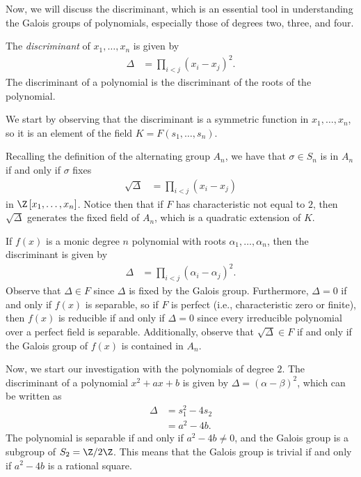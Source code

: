\documentclass[10pt]{mypackage}
\begin{document}
Now, we will discuss the discriminant, which is an essential tool in understanding the Galois groups of polynomials, especially those of degrees two, three, and four.
\begin{definition}
  The \textit{discriminant} of $x_1,\dots,x_n$ is given by
  \begin{align*}
    \Delta &= \prod_{i < j} \left( x_i-x_j \right)^2.
  \end{align*}
  The discriminant of a polynomial is the discriminant of the roots of the polynomial.
\end{definition}
We start by observing that the discriminant is a symmetric function in $x_1,\dots,x_n$, so it is an element of the field $K = F\left( s_1,\dots,s_n \right)$.

Recalling the definition of the alternating group $A_n$, we have that $\sigma\in S_n$ is in $A_n$ if and only if $\sigma$ fixes
\begin{align*}
  \sqrt{\Delta} &= \prod_{i < j} \left( x_i-x_j \right)
\end{align*}
in $\Z\left[ x_1,\dots,x_n \right]$. Notice then that if $F$ has characteristic not equal to $2$, then $\sqrt{\Delta}$ generates the fixed field of $A_n$, which is a quadratic extension of $K$.

If $f(x)$ is a monic degree $n$ polynomial with roots $\alpha_1,\dots,\alpha_n$, then the discriminant is given by
\begin{align*}
  \Delta &= \prod_{i < j} \left( \alpha_i - \alpha_j \right)^2.
\end{align*}
Observe that $\Delta\in F$ since $\Delta$ is fixed by the Galois group. Furthermore, $\Delta = 0$ if and only if $f(x)$ is separable, so if $F$ is perfect (i.e., characteristic zero or finite), then $f(x)$ is reducible if and only if $\Delta = 0$ since every irreducible polynomial over a perfect field is separable. Additionally, observe that $\sqrt{\Delta}\in F$ if and only if the Galois group of $f(x)$ is contained in $A_n$.

Now, we start our investigation with the polynomials of degree $2$. The discriminant of a polynomial $x^2 + ax + b$ is given by $\Delta = \left( \alpha-\beta \right)^2$, which can be written as
\begin{align*}
  \Delta &= s_1^2 - 4s_2\\
         &= a^2 - 4b.
\end{align*}
The polynomial is separable if and only if $a^2-4b \neq 0$, and the Galois group is a subgroup of $S_2 = \Z/2\Z$. This means that the Galois group is trivial if and only if $a^2 - 4b$ is a rational square.
\end{document}
